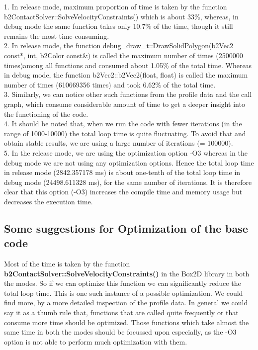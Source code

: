 \documentclass[11pt]{article}
\begin{document}
1. In release mode, maximum proportion of time is taken by the function \\ b2ContactSolver::SolveVelocityConstraints() which is about 33\%, whereas, in debug mode the same function takes only 10.7\% of the time, though it still remains the most time-consuming. \\

2. In release mode, the function debug\_draw\_t::DrawSolidPolygon(b2Vec2 const*, int, b2Color const\&) is called the maximum number of times (2500000 times)among all functions and consumed about 1.05\% of the total time. Whereas in debug mode, the function b2Vec2::b2Vec2(float, float) is called the maximum number of times (610669356 times) and took 6.62\% of the total time. \\

3. Similarly, we can notice other such functions from the profile data and the call graph, which consume considerable amount of time to get a deeper insight into the functioning of the code. \\

4. It should be noted that, when we run the code with fewer iterations (in the range of 1000-10000) the total loop time is quite fluctuating. To avoid that and obtain stable results, we are using a large number of iterations (= 100000). \\

5. In the release mode, we are using the optimization option -O3 whereas in the debug mode we are not using any optimization options. Hence the total loop time in release mode (2842.357178 ms) is about one-tenth of the total loop time in debug mode (24498.611328 ms), for the same number of iterations. It is therefore clear that this option (-O3) increases the compile time and memory usage but decreases the execution time.


\subsection{Some suggestions for Optimization of the base code}
Most of the time is taken by the function \textbf{b2ContactSolver::SolveVelocityConstraints()} in the Box2D library in both the modes. So if we can optimize this function we can significantly reduce the total loop time. This is one such instance of a possible optimization. We could find more, by a more detailed inspection of the profile data. In general we could say it as a thumb rule that, functions that are called quite frequently or that consume more time should be optimized. Those functions which take almost the same time in both the modes should be focussed upon especially, as the -O3 option is not able to perform much optimization with them.
\end{document}
